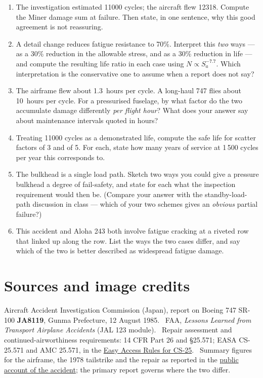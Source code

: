 \documentclass[11pt,a4paper]{article}
\begin{document}
\begin{enumerate}[nosep]
  \item The investigation estimated \SI{11000}{} cycles; the aircraft flew \SI{12318}{}. Compute the Miner damage sum at failure. Then state, in one sentence, why this good agreement is not reassuring.
  \item A detail change reduces fatigue resistance to 70\%. Interpret this \emph{two} ways --- as a 30\% reduction in the allowable stress, and as a 30\% reduction in life --- and compute the resulting life ratio in each case using $N\propto S_a^{-7.7}$. Which interpretation is the conservative one to assume when a report does not say?
  \item The airframe flew about \SI{1.3}{hours} per cycle. A long-haul 747 flies about \SI{10}{hours} per cycle. For a pressurised fuselage, by what factor do the two accumulate damage differently \emph{per flight hour}? What does your answer say about maintenance intervals quoted in hours?
  \item Treating \SI{11000}{} cycles as a demonstrated life, compute the safe life for scatter factors of 3 and of 5. For each, state how many years of service at 1\,500 cycles per year this corresponds to.
  \item The bulkhead is a single load path. Sketch two ways you could give a pressure bulkhead a degree of fail-safety, and state for each what the inspection requirement would then be. (Compare your answer with the standby-load-path discussion in class --- which of your two schemes gives an \emph{obvious} partial failure?)
  \item This accident and Aloha 243 both involve fatigue cracking at a riveted row that linked up along the row. List the ways the two cases differ, and say which of the two is better described as widespread fatigue damage.
\end{enumerate}

\section*{Sources and image credits}
\footnotesize
Aircraft Accident Investigation Commission (Japan), report on Boeing 747 SR-100 \textbf{JA8119}, Gunma Prefecture, 12 August 1985. \ FAA, \emph{Lessons Learned from Transport Airplane Accidents} (JAL 123 module). \ Repair assessment and continued-airworthiness requirements: 14 CFR Part 26 and \S25.571; EASA CS-25.571 and AMC 25.571, in the \href{https://www.easa.europa.eu/en/document-library/easy-access-rules/online-publications/easy-access-rules-large-aeroplanes-cs-25}{Easy Access Rules for CS-25}. \ Summary figures for the airframe, the 1978 tailstrike and the repair as reported in the \href{https://en.wikipedia.org/wiki/Japan_Air_Lines_Flight_123}{public account of the accident}; the primary report governs where the two differ.
\end{document}
